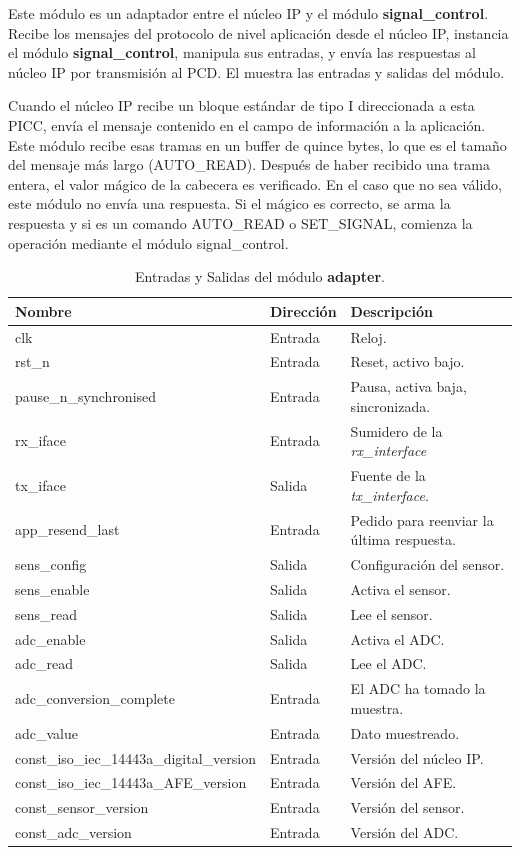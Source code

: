 \documentclass[a4paper, twoside, 11pt]{report}
\begin{document}
Este módulo es un adaptador entre el núcleo IP y el módulo \textbf{signal\_control}. Recibe los mensajes del protocolo de nivel aplicación desde el núcleo IP, instancia el módulo \textbf{signal\_control}, manipula sus entradas, y envía las respuestas al núcleo IP por transmisión al PCD. El  muestra las entradas y salidas del módulo.

Cuando el núcleo IP recibe un bloque estándar de tipo I direccionada a esta PICC, envía el mensaje contenido en el campo de información a la aplicación. Este módulo recibe esas tramas en un buffer de quince bytes, lo que es el tamaño del mensaje más largo (AUTO\_READ). Después de haber recibido una trama entera, el valor mágico de la cabecera es verificado. En el caso que no sea válido, este módulo no envía una respuesta. Si el mágico es correcto, se arma la respuesta y si es un comando AUTO\_READ o SET\_SIGNAL, comienza la operación mediante el módulo signal\_control.

\begin{table}[htb]
  \centering
  \tablezebra
  \begin{tabulary}{\linewidth}{l|l|L}
    \setcounter{rownum}{0}
    \textbf{Nombre}&\textbf{Dirección}&\textbf{Descripción} \\
    \hline
    clk&Entrada&Reloj. \\
    rst\_n&Entrada&Reset, activo bajo. \\
    pause\_n\_synchronised&Entrada&Pausa, activa baja, sincronizada. \\
    rx\_iface&Entrada&Sumidero de la \textit{rx\_interface} \\
    tx\_iface&Salida&Fuente de la \textit{tx\_interface}. \\
    app\_resend\_last&Entrada&Pedido para reenviar la última respuesta. \\
    sens\_config&Salida&Configuración del sensor. \\
    sens\_enable&Salida&Activa el sensor. \\
    sens\_read&Salida&Lee el sensor. \\
    adc\_enable&Salida&Activa el ADC. \\
    adc\_read&Salida&Lee el ADC. \\
    adc\_conversion\_complete&Entrada&El ADC ha tomado la muestra. \\
    adc\_value&Entrada&Dato muestreado. \\
    const\_iso\_iec\_14443a\_digital\_version&Entrada&Versión del núcleo IP. \\
    const\_iso\_iec\_14443a\_AFE\_version&Entrada&Versión del AFE. \\
    const\_sensor\_version&Entrada&Versión del sensor. \\
    const\_adc\_version&Entrada&Versión del ADC. \\
  \end{tabulary}
  \caption{Entradas y Salidas del módulo \textbf{adapter}.}
  \label{tab:ports_adapter}
\end{table}
\end{document}
